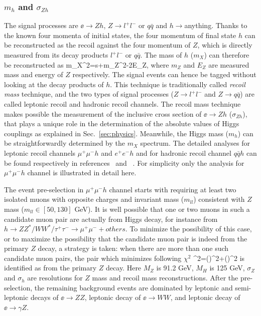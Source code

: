 
\subsubsection{$m_h$ and $\sigma_{Zh}$}
\label{sec:higgs:sigmazh}
The signal processes are $\ee\to Zh$, $Z\to l^+l^-$ or $q\bar{q}$ and 
$h\to$anything. Thanks to the known four momenta of initial states, 
the four momentum of final state $h$ can be reconstructed 
as the recoil against the four momentum of $Z$, which is directly
measured from its decay products $l^+l^-$ or $q\bar{q}$. 
The mass of $h$ ($m_X$) can therefore be reconstructed as
\beq
m_X^2=s+m_Z^2-2E_Z,
where $m_Z$ and $E_Z$ are measured mass and energy of $Z$
respectively. The signal events can hence be tagged without looking
at the decay products of $h$. This technique is traditionally called
{\it recoil mass} technique, and the two types of signal processes 
($Z\to l^+l^-$ and $Z\to q\bar{q}$) are called
leptonic recoil and hadronic recoil channels. The recoil mass technique
makes possible the measurement of the inclusive cross section of $\ee\to Zh$ ($\sigma_{Zh}$),
that plays a unique role in the determination of the absolute values of
Higgs couplings as explained in Sec.~\ref{sec:physics}.
Meanwhile, the Higgs mass ($m_h$) can be straightforwardly determined by 
the $m_X$ spectrum. The detailed analyses for leptonic recoil channels
$\mu^+\mu^-h$ and $e^+e^-h$ and for hadronic recoil channel $q\bar{q}h$
can be found respectively in references~\cite{Yan:2016xyx} and 
~\cite{Tomita:2015,Thomson:2015jda,Miyamoto:2013zva}. For simplicity only the analysis for $\mu^+\mu^-h$ channel is illustrated in detail here.

The event pre-selection in $\mu^+\mu^-h$ channel starts with requiring at least 
two isolated muons with opposite charges and invariant mass ($m_{ll}$) consistent 
with $Z$ mass ($m_{ll}\in[50,130]$ GeV). 
It is well possible that one or two muons in such a candidate 
muon pair are actually from Higgs decay, for instance from 
$h\to ZZ^*/WW^*/\tau^+\tau^-\to \mu^+\mu^-+others$. To minimize the possibility of
this case, or to maximize the possibility that the candidate muon pair is 
indeed from the primary $Z$ decay, a strategy is taken:
when there are more than one such candidate muon pairs,
the pair which minimizes following $\chi^2$ 
\beq
\chi^2=()^2+()^2
is identified as from the primary $Z$ decay. Here $M_Z$ is 91.2 GeV,
$M_H$ is 125 GeV, $\sigma_Z$ and $\sigma_h$ are resolutions for 
$Z$ mass and recoil mass reconstructions. 
After the pre-selection, the remaining background events are dominated by
leptonic and semi-leptonic decays of $\ee\to ZZ$, leptonic decay of $\ee\to WW$, 
and leptonic decay of $\ee\to \gamma Z$. 

